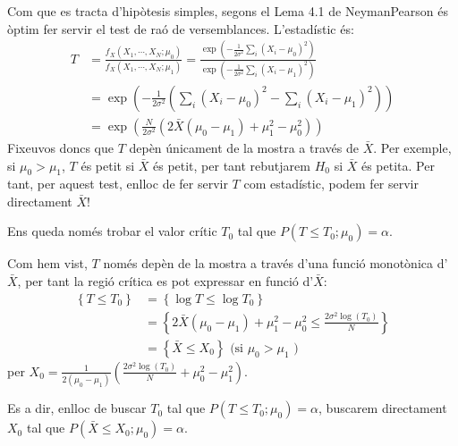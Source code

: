 \documentclass[letterpaper,10pt,english]{sphinxmanual}
\let\sphinxpxdimen\pdfpxdimen\else\newdimen\sphinxpxdimen
\begin{document}
\noindent{\hspace*{\fill}\sphinxincludegraphics[height=250\sphinxpxdimen]{{exemple_ir}.png}\hspace*{\fill}}

Com que es tracta d’hipòtesis simples, segons el Lema 4.1 de Neyman\sphinxhyphen{}Pearson
és òptim fer servir el test de raó de versemblances. L’estadístic és:
\begin{equation*}
\begin{split}T &= \frac{f_X(X_1, \cdots, X_N; \mu_0)}{f_X(X_1, \cdots, X_N; \mu_1)} = \frac{\exp\left(-\frac{1}{2\sigma^2}\sum_i \left(X_i - \mu_0 \right)^2 \right)}{\exp\left(-\frac{1}{2\sigma^2}\sum_i \left(X_i - \mu_1 \right)^2 \right)} \\
  &= \exp\left(-\frac{1}{2\sigma^2}\left(\sum_i \left(X_i - \mu_0 \right)^2 - \sum_i \left(X_i - \mu_1 \right)^2 \right)\right) \\
  &= \exp\left(\frac{N}{2\sigma^2}\left(2\bar{X}(\mu_0 - \mu_1) + \mu_1^2 - \mu_0^2\right)\right)\end{split}
\end{equation*}
Fixeu\sphinxhyphen{}vos doncs que \(T\) depèn únicament de la mostra a través de \(\bar{X}\).
Per exemple, si \(\mu_0 > \mu_1\), \(T\) és petit si \(\bar{X}\) és petit,
per tant rebutjarem \(H_0\) si \(\bar{X}\) és petita. Per tant, per aquest test,
enlloc de fer servir \(T\) com estadístic, podem fer servir directament \(\bar{X}\)!

Ens queda només trobar el valor crític \(T_0\) tal que \(P(T \leq T_0; \mu_0) = \alpha\).

Com hem vist, \(T\) només depèn de la mostra a través d’una funció monotònica d’ \(\bar{X}\), per tant la regió crítica
es pot expressar en funció d’\(\bar{X}\):
\begin{equation*}
\begin{split} \left\{T \leq T_0 \right\} &= \left\{ \log T \leq \log T_0 \right\} \\
& = \left\{2\bar{X}(\mu_0 - \mu_1) + \mu_1^2 - \mu_0^2 \leq \frac{2 \sigma^2\log(T_0)}{N} \right\} \\
& = \left\{\bar{X} \leq X_0\right\} \mbox{ (si } \mu_0 > \mu_1 \mbox{ )}\end{split}
\end{equation*}
per \(X_0 = \frac{1}{2\left(\mu_0 - \mu_1\right)}\left(\frac{2 \sigma^2\log(T_0)}{N} + \mu_0^2 - \mu_1^2 \right)\).

Es a dir, enlloc de buscar \(T_0\) tal que \(P(T \leq T_0; \mu_0) = \alpha\),
buscarem directament \(X_0\) tal que \(P(\bar{X} \leq X_0; \mu_0) = \alpha\).
\end{document}
